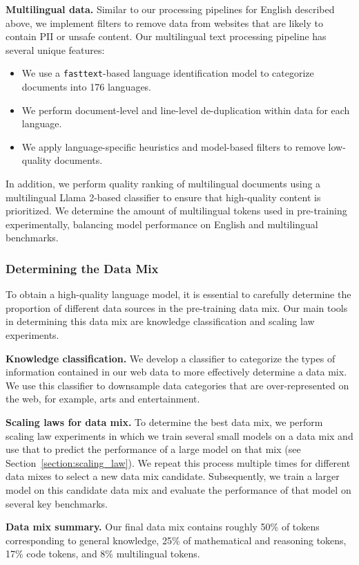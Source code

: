 \documentclass[dvipsnames]{fairmeta}
\begin{document}
\textbf{Multilingual data.}
Similar to our processing pipelines for English described above, we implement filters to remove data from websites that are likely to contain PII or unsafe content.  
Our multilingual text processing pipeline has several unique features:
\begin{itemize}
\item We use a \texttt{fasttext}-based language identification model to categorize documents into 176 languages.
\item We perform document-level and line-level de-duplication within data for each language.
\item We apply language-specific heuristics and model-based filters to remove low-quality documents.
\end{itemize}

In addition, we perform quality ranking of multilingual documents using a multilingual Llama 2-based classifier to ensure that high-quality content is prioritized.
We determine the amount of multilingual tokens used in pre-training experimentally, balancing model performance on  English and multilingual benchmarks.

\subsubsection{Determining the Data Mix}
To obtain a high-quality language model, it is essential to carefully determine the proportion of different data sources in the pre-training data mix. 
Our main tools in determining this data mix are knowledge classification and scaling law experiments.

\textbf{Knowledge classification.}
We develop a classifier to categorize the types of information contained in our web data to more effectively determine a data mix.
We use this classifier to downsample data categories that are over-represented on the web, for example, arts and entertainment.

\textbf{Scaling laws for data mix.}
To determine the best data mix, we perform scaling law experiments in which we train several small models on a data mix and use that to predict the performance of a large model on that mix (see Section~\ref{section:scaling_law}).
We repeat this process multiple times for different data mixes to select a new data mix candidate.
Subsequently, we train a larger model on this candidate data mix and evaluate the performance of that model on several key benchmarks.

\textbf{Data mix summary.}
Our final data mix contains roughly 50\% of tokens corresponding to general knowledge, 25\% of mathematical and reasoning tokens, 17\% code tokens, and 8\% multilingual tokens.
\end{document}
